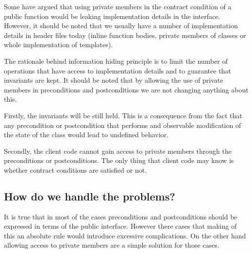 Some have argued that using private members in the contract condition of a
public function would be leaking implementation details in the interface.
However, it should be noted that we usually have a number of implementation
details in header files today (inline function bodies, private members of
classes or whole implementation of templates).

The rationale behind information hiding principle is to limit the number of
operations that have access to implementation details and to guarantee that
invariants are kept. It should be noted that by allowing the use of private
members in preconditions and postconditions we are not changing anything about
this.

Firstly, the invariants will be still held. This is a consequence from the fact
that any precondition or postcondition that performs and observable modification
of the state of the class would lead to undefined behavior.

Secondly, the client code cannot gain access to private members through the
preconditions or postconditions. The only thing that client code may know is
whether contract conditions are satisfied or not.

\subsection{How do we handle the problems?}

It is true that in most of the cases preconditions and postconditions should be
expressed in terms of the public interface. However there cases that making of
this an absolute rule would introduce excessive complications. On the other hand
allowing access to private members are a simple solution for those cases.


